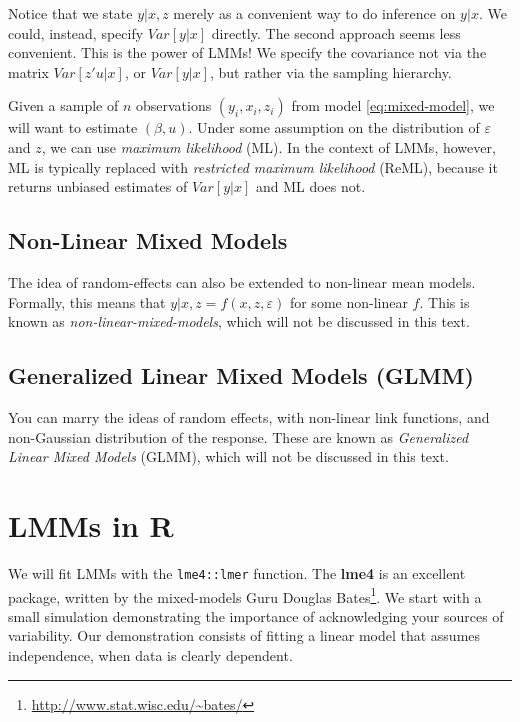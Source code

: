 \documentclass[]{book}
\renewcommand{\href}[2]{#2\footnote{\url{#1}}}
\theoremstyle{definition}
\theoremstyle{definition}
\theoremstyle{definition}
\theoremstyle{remark}
\begin{document}
Notice that we state \(y|x,z\) merely as a convenient way to do inference on \(y|x\).
We could, instead, specify \(Var[y|x]\) directly.
The second approach seems less convenient.
This is the power of LMMs!
We specify the covariance not via the matrix \(Var[z'u|x]\), or \(Var[y|x]\), but rather via the sampling hierarchy.

Given a sample of \(n\) observations \((y_i,x_i,z_i)\) from model \eqref{eq:mixed-model}, we will want to estimate \((\beta,u)\).
Under some assumption on the distribution of \(\varepsilon\) and \(z\), we can use \emph{maximum likelihood} (ML).
In the context of LMMs, however, ML is typically replaced with \emph{restricted maximum likelihood} (ReML), because it returns unbiased estimates of \(Var[y|x]\) and ML does not.

\hypertarget{non-linear-mixed-models}{%
\subsection{Non-Linear Mixed Models}\label{non-linear-mixed-models}}

The idea of random-effects can also be extended to non-linear mean models.
Formally, this means that \(y|x,z=f(x,z,\varepsilon)\) for some non-linear \(f\).
This is known as \emph{non-linear-mixed-models}, which will not be discussed in this text.

\hypertarget{generalized-linear-mixed-models-glmm}{%
\subsection{Generalized Linear Mixed Models (GLMM)}\label{generalized-linear-mixed-models-glmm}}

You can marry the ideas of random effects, with non-linear link functions, and non-Gaussian distribution of the response.
These are known as \emph{Generalized Linear Mixed Models} (GLMM), which will not be discussed in this text.

\hypertarget{lmms-in-r}{%
\section{LMMs in R}\label{lmms-in-r}}

We will fit LMMs with the \texttt{lme4::lmer} function.
The \textbf{lme4} is an excellent package, written by the mixed-models Guru \href{http://www.stat.wisc.edu/~bates/}{Douglas Bates}.
We start with a small simulation demonstrating the importance of acknowledging your sources of variability.
Our demonstration consists of fitting a linear model that assumes independence, when data is clearly dependent.
\end{document}
